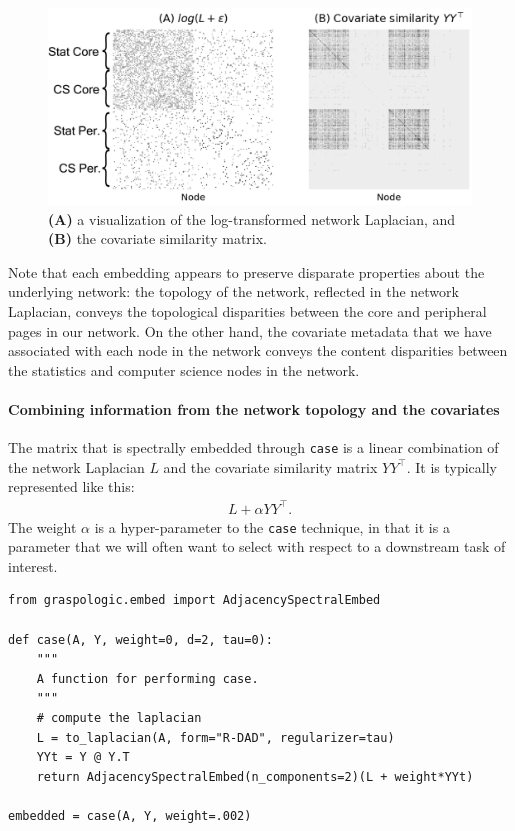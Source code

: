 \begin{figure}
    \centering
    \includegraphics[width=\linewidth]{representations/ch6/Images/casc_inputs.png}
    \caption[inputs to \texttt{case}]{\textbf{(A)} a visualization of the log-transformed network Laplacian, and \textbf{(B)} the covariate similarity matrix.}
    \label{fig:ch6:casc:casc_inputs}
\end{figure}

Note that each embedding appears to preserve disparate properties about the underlying network: the topology of the network, reflected in the network Laplacian, conveys the topological disparities between the core and peripheral pages in our network. On the other hand, the covariate metadata that we have associated with each node in the network conveys the content disparities between the statistics and computer science nodes in the network. 

\paragraph*{Combining information from the network topology and the covariates}

The matrix that is spectrally embedded through \texttt{case} is a linear combination of the network Laplacian $L$ and the covariate similarity matrix $YY^\top$. It is typically represented like this:
\begin{align*}
    L + \alpha YY^\top.
\end{align*}
The weight $\alpha$ is a hyper-parameter to the \texttt{case} technique, in that it is a parameter that we will often want to select with respect to a downstream task of interest. 

\begin{lstlisting}[style=python]
from graspologic.embed import AdjacencySpectralEmbed

def case(A, Y, weight=0, d=2, tau=0):
    """
    A function for performing case.
    """
    # compute the laplacian
    L = to_laplacian(A, form="R-DAD", regularizer=tau)
    YYt = Y @ Y.T
    return AdjacencySpectralEmbed(n_components=2)(L + weight*YYt)

embedded = case(A, Y, weight=.002)
\end{lstlisting}

